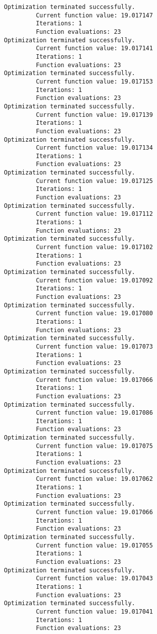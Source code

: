 \documentclass[11pt]{article}
\begin{document}
\begin{Verbatim}[commandchars=\\\{\}]
Optimization terminated successfully.
         Current function value: 19.017147
         Iterations: 1
         Function evaluations: 23
Optimization terminated successfully.
         Current function value: 19.017141
         Iterations: 1
         Function evaluations: 23
Optimization terminated successfully.
         Current function value: 19.017153
         Iterations: 1
         Function evaluations: 23
Optimization terminated successfully.
         Current function value: 19.017139
         Iterations: 1
         Function evaluations: 23
Optimization terminated successfully.
         Current function value: 19.017134
         Iterations: 1
         Function evaluations: 23
Optimization terminated successfully.
         Current function value: 19.017125
         Iterations: 1
         Function evaluations: 23
Optimization terminated successfully.
         Current function value: 19.017112
         Iterations: 1
         Function evaluations: 23
Optimization terminated successfully.
         Current function value: 19.017102
         Iterations: 1
         Function evaluations: 23
Optimization terminated successfully.
         Current function value: 19.017092
         Iterations: 1
         Function evaluations: 23
Optimization terminated successfully.
         Current function value: 19.017080
         Iterations: 1
         Function evaluations: 23
Optimization terminated successfully.
         Current function value: 19.017073
         Iterations: 1
         Function evaluations: 23
Optimization terminated successfully.
         Current function value: 19.017066
         Iterations: 1
         Function evaluations: 23
Optimization terminated successfully.
         Current function value: 19.017086
         Iterations: 1
         Function evaluations: 23
Optimization terminated successfully.
         Current function value: 19.017075
         Iterations: 1
         Function evaluations: 23
Optimization terminated successfully.
         Current function value: 19.017062
         Iterations: 1
         Function evaluations: 23
Optimization terminated successfully.
         Current function value: 19.017066
         Iterations: 1
         Function evaluations: 23
Optimization terminated successfully.
         Current function value: 19.017055
         Iterations: 1
         Function evaluations: 23
Optimization terminated successfully.
         Current function value: 19.017043
         Iterations: 1
         Function evaluations: 23
Optimization terminated successfully.
         Current function value: 19.017041
         Iterations: 1
         Function evaluations: 23

\end{Verbatim}
\end{document}
